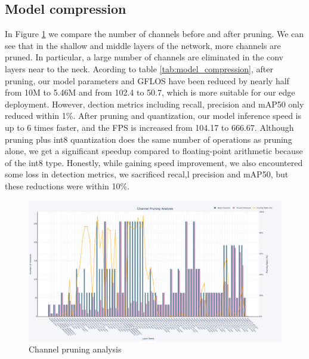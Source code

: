 \documentclass[10pt]{article}
\begin{document}
\subsection{Model compression}
In Figure \ref{fig:Channel} we compare the number of channels before and after pruning. We can see that in the shallow and middle layers of the network, more channels are pruned. In particular, a large number of channels are eliminated in the conv layers near to the neck. Acording to table \ref{tab:model_compression}, after pruning, our model parameters and GFLOS have been reduced by nearly half from 10M to 5.46M and  from 102.4 to 50.7, which is more suitable for our edge deployment. However, dection metrics including recall, precision and mAP50 only reduced within 1\%. After pruning and quantization, our model inference speed is up to 6 times faster, and the FPS is increased from 104.17 to 666.67. Although pruning plus int8 quantization does the same number of operations as pruning alone, we get a significant speedup compared to floating-point arithmetic because of the int8 type. Honestly, while gaining speed improvement, we also encountered some loss in detection metrics, we sacrificed recal,l precision and mAP50, but these reductions were within 10\%.

\begin{figure}[!h]
\centering
\includegraphics[width=1.0\linewidth]{images/channel.png}
\caption{Channel pruning analysis}
\label{fig:Channel}
\end{figure}
\end{document}
